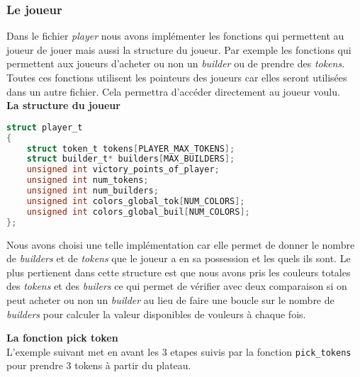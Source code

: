 \documentclass{article}
\begin{document}
\subsubsection{Le joueur}

\hspace{1em} Dans le fichier \emph{player} nous avons implémenter les fonctions qui permettent au joueur de jouer mais aussi la structure du joueur. Par exemple les fonctions qui permettent aux joueurs d'acheter ou non un \emph{builder} ou de prendre des \emph{tokens}. Toutes ces fonctions utilisent les pointeurs des joueurs car elles seront utilisées dans un autre fichier. Cela permettra d'accéder directement au joueur voulu.\\

\textbf{La structure du joueur}
\begin{tcolorbox}[colback=gray!10,colframe=white!75!black]
\begin{lstlisting}[language=C, caption={la structure joueur}, label={lst:exemple10-c}]
struct player_t 
{
    struct token_t tokens[PLAYER_MAX_TOKENS];
    struct builder_t* builders[MAX_BUILDERS];
    unsigned int victory_points_of_player;
    unsigned int num_tokens;
    unsigned int num_builders;
    unsigned int colors_global_tok[NUM_COLORS];
    unsigned int colors_global_buil[NUM_COLORS];
};
\end{lstlisting}
\end{tcolorbox}

\vspace{1em}
\hspace{1em} Nous avons choisi une telle implémentation car elle permet de donner le nombre de \emph{builders} et de \emph{tokens} que le joueur a en sa possession et les quels ils sont. Le plus pertienent dans cette structure est que nous avons pris les couleurs totales des \emph{tokens} et des \emph{builers} ce qui permet de vérifier avec deux comparaison si on peut acheter ou non un \emph{builder} au lieu de faire une boucle sur le nombre de \emph{builders} pour calculer la valeur disponibles de vouleurs à chaque fois. 

\textbf{La fonction pick token} \\
\vspace{1em }
\hspace{1em} L'exemple suivant met en avant les 3 etapes suivis par la fonction \texttt{pick\_tokens} pour prendre 3 tokens à partir du plateau.
\end{document}
